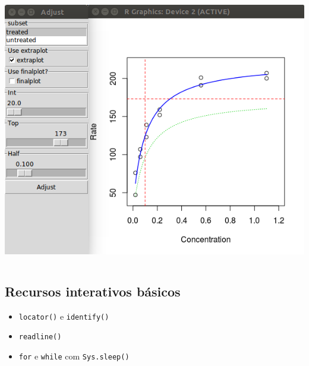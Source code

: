 \begin{frame}
\begin{columns}[t]
\begin{column}{.6\textwidth}
{{      \includegraphics[scale=0.3]{images/preview_rpanel}}}
\end{column}
    \end{columns}

\end{frame}

\subsection{Recursos interativos básicos}

\begin{frame}

  \begin{itemize}
  \item \texttt{locator()} e \texttt{identify()}
  \item \texttt{readline()}
  \item \texttt{for} e \texttt{while} com \texttt{Sys.sleep()}
  \end{itemize}

\end{frame}
